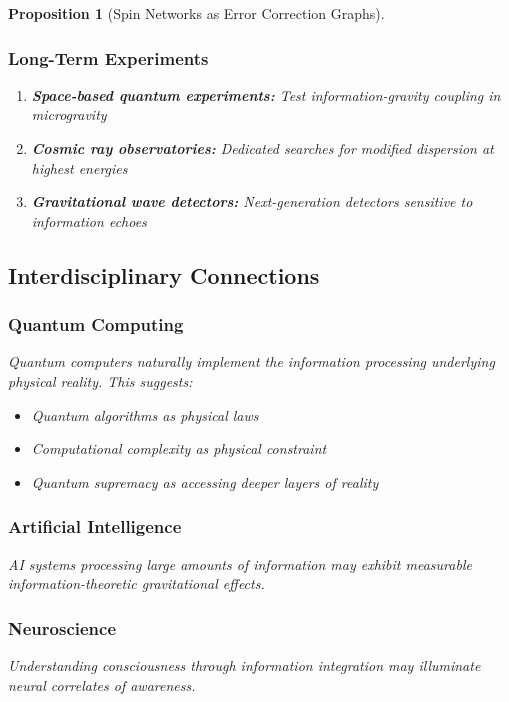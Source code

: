 \documentclass[12pt,a4paper]{article}
\newtheorem{proposition}[theorem]{Proposition}
\theoremstyle{remark}
\begin{document}
\begin{proposition}[Spin Networks as Error Correction Graphs]
\subsubsection{Long-Term Experiments}

\begin{enumerate}
\item \textbf{Space-based quantum experiments:} Test information-gravity coupling in microgravity
\item \textbf{Cosmic ray observatories:} Dedicated searches for modified dispersion at highest energies
\item \textbf{Gravitational wave detectors:} Next-generation detectors sensitive to information echoes
\end{enumerate}

\subsection{Interdisciplinary Connections}

\subsubsection{Quantum Computing}

Quantum computers naturally implement the information processing underlying physical reality. This suggests:

\begin{itemize}
\item Quantum algorithms as physical laws
\item Computational complexity as physical constraint
\item Quantum supremacy as accessing deeper layers of reality
\end{itemize}

\subsubsection{Artificial Intelligence}

AI systems processing large amounts of information may exhibit measurable information-theoretic gravitational effects.

\subsubsection{Neuroscience}

Understanding consciousness through information integration may illuminate neural correlates of awareness.


\end{proposition}
\end{document}
